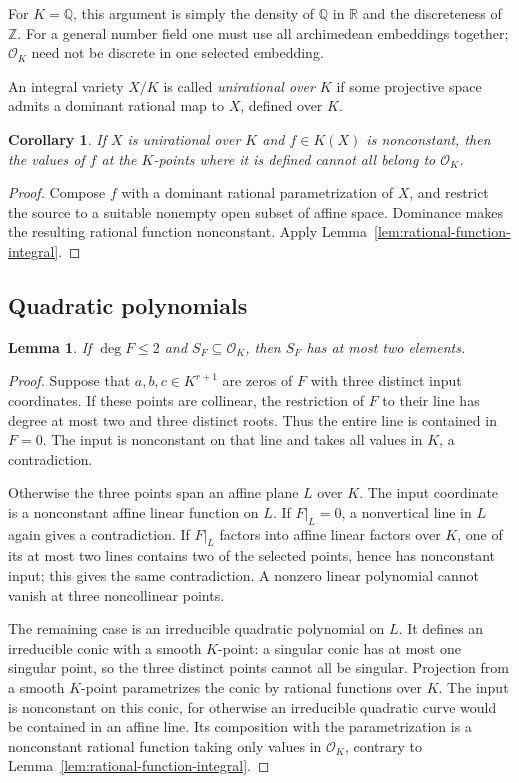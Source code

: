 \documentclass[11pt]{article}
\newtheorem{lemma}[theorem]{Lemma}
\newtheorem{corollary}[theorem]{Corollary}
\theoremstyle{definition}
\begin{document}
For $K=\mathbb Q$, this argument is simply the density of $\mathbb Q$ in
$\mathbb R$ and the discreteness of $\mathbb Z$.  For a general number field
one must use all archimedean embeddings together; $\mathcal O_K$ need not be
discrete in one selected embedding.

An integral variety $X/K$ is called \emph{unirational over $K$} if some
projective space admits a dominant rational map to $X$, defined over $K$.

\begin{corollary}\label{cor:unirational-integral}
If $X$ is unirational over $K$ and $f\in K(X)$ is nonconstant, then the values
of $f$ at the $K$-points where it is defined cannot all belong to
$\mathcal O_K$.
\end{corollary}
\begin{proof}
Compose $f$ with a dominant rational parametrization of $X$, and restrict
the source to a suitable nonempty open subset of affine space.  Dominance
makes the resulting rational function nonconstant.  Apply
Lemma~\ref{lem:rational-function-integral}.
\end{proof}

\subsection{Quadratic polynomials}

\begin{lemma}\label{lem:quadratic-integral}
If $\deg F\le2$ and $S_F\subseteq\mathcal O_K$, then $S_F$ has at most two
elements.
\end{lemma}
\begin{proof}
Suppose that $a,b,c\in K^{r+1}$ are zeros of $F$ with three distinct input
coordinates.  If these points are collinear, the restriction of $F$ to their
line has degree at most two and three distinct roots.  Thus the entire
line is contained in $F=0$.  The input is nonconstant on that line and takes
all values in $K$, a contradiction.

Otherwise the three points span an affine plane $L$ over $K$.  The input
coordinate is a nonconstant affine linear function on $L$.  If
$F|_L=0$, a nonvertical line in $L$ again gives a contradiction.  If
$F|_L$ factors into affine linear factors over $K$, one of its at most two
lines contains two of the selected points, hence has nonconstant input;
this gives the same contradiction.  A nonzero linear polynomial cannot
vanish at three noncollinear points.

The remaining case is an irreducible quadratic polynomial on $L$.
It defines an irreducible conic with a smooth $K$-point: a singular conic
has at most one singular point, so the three distinct points cannot all be
singular.  Projection from a smooth $K$-point parametrizes the conic by
rational functions over $K$.  The input is nonconstant on this conic,
for otherwise an irreducible quadratic curve would be contained in an
affine line.  Its composition with the parametrization is a nonconstant
rational function taking only values in $\mathcal O_K$, contrary to
Lemma~\ref{lem:rational-function-integral}.
\end{proof}
\end{document}
